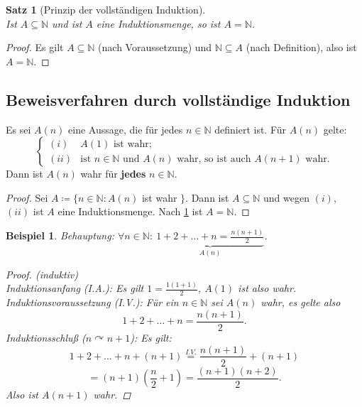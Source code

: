 \documentclass[12pt]{extreport} %
\newcommand{\N}{\mathbb{N}}
\theoremstyle{named}
\theoremstyle{itshape}
\newtheorem{satz}[unnamedtheorem]{Satz}
\theoremstyle{normal}
\newtheorem*{beispiel*}{Beispiel}
\begin{document}
\begin{satz}[Prinzip der vollständigen Induktion] \label{1.4:prop} ~\\
	Ist $A \subseteq \N$ und ist $A$ eine Induktionsmenge, so ist $A = \N$.
\end{satz}

\begin{proof}
	Es gilt $A \subseteq \N$ (nach Voraussetzung) und $\N \subseteq A$ (nach Definition), also ist $A = \N$.
\end{proof}



\subsection*{Beweisverfahren durch vollständige Induktion}
Es sei $A(n)$ eine Aussage, die für jedes $n \in \N$ definiert ist. Für $A(n)$ gelte:
$$\begin{cases}
	(i) & A(1) \text{ ist wahr;} \\ (ii) & \text{ist } n \in \N \text{ und } A(n) \text{ wahr, so ist auch } A(n + 1) \text{ wahr.}
\end{cases}$$
Dann ist $A(n)$ wahr für \textbf{jedes} $n \in \N$.

\begin{proof}
	Sei $A \coloneqq \{ n \in \N : A(n)$ ist wahr $\}$. Dann ist $A \subseteq \N$ und wegen $(i)$, $(ii)$ ist $A$ eine Induktionsmenge.
	Nach {\ref{1.4:prop}} ist $A = \N$.
\end{proof}

\bigskip

\begin{beispiel*}
	Behauptung: $\forall n \in \N: ~ \underbrace{1 + 2 + \dotsc + n = \frac{n (n + 1)}{2}}_{A(n)}$.	
	\begin{proof}(induktiv) \\
		Induktionsanfang (I.A.): Es gilt $1 = \frac{1 (1 + 1)}{2}$, $A(1)$ ist also wahr. \\
		Induktionsvoraussetzung (I.V.): Für ein $n \in \N$ sei $A(n)$ wahr, es gelte also 
		$$1 + 2 + \dotsc + n = \frac{n (n + 1)}{2}.$$
		Induktionsschlu{\ss} ($n \curvearrowright n + 1$): Es gilt:
		$$
		1 + 2 + \dotsc + n + (n + 1) \overset{I.V.}{=}  \frac{n (n + 1)}{2} + (n + 1)
		$$	
		$$
		= (n + 1) \left( \frac{n}{2} + 1 \right)  = \frac{(n + 1)(n + 2)}{2}.
		$$
		Also ist $A(n + 1)$ wahr.
	\end{proof}
\end{beispiel*}
\end{document}

